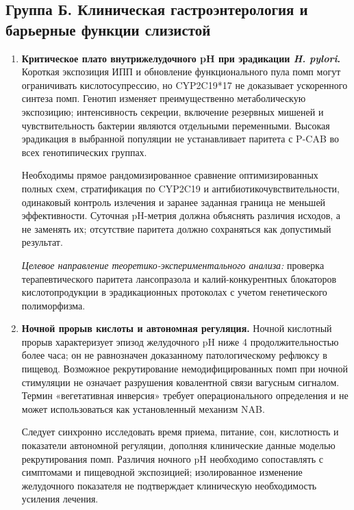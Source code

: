 \documentclass[11pt,a4paper,notitlepage]{report}
\newcommand{\Hp}{\textit{H. pylori}}
\newcommand{\src}[1]{\unskip\space\cite{#1}}
\begin{document}
\subsection{Группа Б. Клиническая гастроэнтерология и барьерные функции слизистой}
\begin{enumerate}[label=\textbf{\arabic*.},start=7,leftmargin=*,itemsep=0.9\baselineskip]

\item \textbf{Критическое плато внутрижелудочного pH при эрадикации \Hp.} Короткая экспозиция ИПП и обновление функционального пула помп могут ограничивать кислотосупрессию, но CYP2C19*17 не доказывает ускоренного синтеза помп. Генотип изменяет преимущественно метаболическую экспозицию; интенсивность секреции, включение резервных мишеней и чувствительность бактерии являются отдельными переменными. Высокая эрадикация в выбранной популяции не устанавливает паритета с P-CAB во всех генотипических группах.\src{cpic,hpphfuruta2001,hpphalcon2022}

Необходимы прямое рандомизированное сравнение оптимизированных полных схем, стратификация по CYP2C19 и антибиотикочувствительности, одинаковый контроль излечения и заранее заданная граница не меньшей эффективности. Суточная pH-метрия должна объяснять различия исходов, а не заменять их; отсутствие паритета должно сохраняться как допустимый результат.

\textit{Целевое направление теоретико-экспериментального анализа:} проверка терапевтического паритета лансопразола и калий-конкурентных блокаторов кислотопродукции в эрадикационных протоколах с учетом генетического полиморфизма.

\item \textbf{Ночной прорыв кислоты и автономная регуляция.} Ночной кислотный прорыв характеризует эпизод желудочного pH ниже 4 продолжительностью более часа; он не равнозначен доказанному патологическому рефлюксу в пищевод. Возможное рекрутирование немодифицированных помп при ночной стимуляции не означает разрушения ковалентной связи вагусным сигналом. Термин «вегетативная инверсия» требует операционального определения и не может использоваться как установленный механизм NAB.\src{futurenab1998,molrestore}

Следует синхронно исследовать время приема, питание, сон, кислотность и показатели автономной регуляции, дополняя клинические данные моделью рекрутирования помп. Различия ночного pH необходимо сопоставлять с симптомами и пищеводной экспозицией; изолированное изменение желудочного показателя не подтверждает клиническую необходимость усиления лечения.


\end{enumerate}
\end{document}
